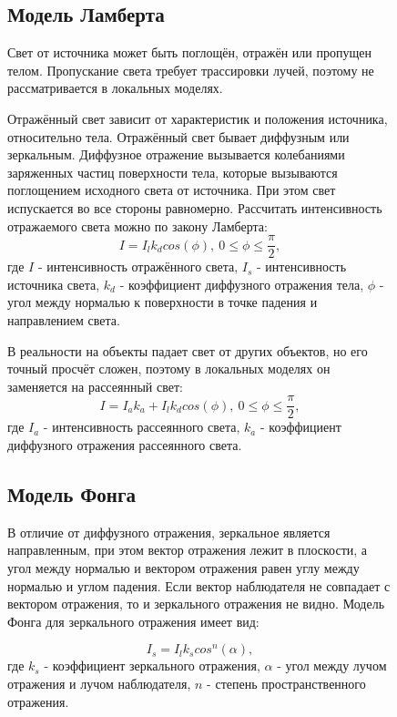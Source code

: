 \begin{figure}[h]
\subsection{Модель Ламберта}
Свет от источника может быть поглощён, отражён или пропущен телом. Пропускание света требует трассировки лучей, поэтому не рассматривается в локальных моделях.

Отражённый свет зависит от характеристик и положения источника, относительно тела. Отражённый свет бывает диффузным или зеркальным. Диффузное отражение вызывается колебаниями заряженных частиц поверхности тела, которые вызываются поглощением исходного света от источника. При этом свет испускается во все стороны равномерно. Рассчитать интенсивность отражаемого света можно по закону Ламберта:
\begin{equation}
	\label{eq:lambert1}
	I = I_{l}k_dcos(\phi),\ 0\leq\phi\leq\frac{\pi}{2},
\end{equation}
где $I$ - интенсивность отражённого света, $I_s$ - интенсивность источника света, $k_d$ - коэффициент диффузного отражения тела, $\phi$ - угол между нормалью к поверхности в точке падения и направлением света.

В реальности на объекты падает свет от других объектов, но его точный просчёт сложен, поэтому в локальных моделях он заменяется на рассеянный свет:
\begin{equation}
	\label{eq:lambert2}
	I = I_ak_a + I_{l}k_dcos(\phi),\ 0\leq\phi\leq\frac{\pi}{2},
\end{equation}
где $I_a$ - интенсивность рассеянного света, $k_a$ - коэффициент диффузного отражения рассеянного света. 

\subsection{Модель Фонга}
В отличие от диффузного отражения, зеркальное является направленным, при этом вектор отражения лежит в плоскости, а угол между нормалью и вектором отражения равен углу между нормалью и углом падения. Если вектор наблюдателя не совпадает с вектором отражения, то и зеркального отражения не видно. Модель Фонга для зеркального отражения имеет вид:

\begin{equation}
	\label{eq:fong-reflection}
	I_s = I_{l}k_scos^n(\alpha),
\end{equation}
где $k_s$ - коэффициент зеркального отражения, $\alpha$ - угол между лучом отражения и лучом наблюдателя, $n$ - степень пространственного отражения.


\end{figure}
